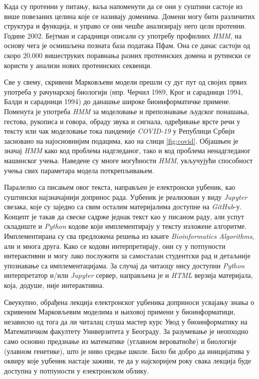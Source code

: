 \documentclass[12pt,oneside]{memoir}
\begin{document}
\begin{CJK}{UTF8}{ipxm}
Када су протеини у питању, ваља напоменути да се они у суштини састоје из више повезаних целина које се називају доменима. Домени могу бити различитих структура и функција, и управо се они чешће анализирају него цели протеини. Године 2002. Бејтман и сарадници описали су употребу профилних \textit{HMM}, на основу чега је осмишљена позната база података Пфам\cite{bateman2002}. Она се данас састоји од скоро 20.000 вишеструких поравнања разних протеинских домена и рутински се користи у анализи нових протеинских секвенци\cite{pfam}.

Све у свему, скривени Марковљеви модели прешли су дуг пут од својих првих употреба у рачунарској биологији (нпр. Черчил 1989\cite{churchill1989}, Крог и сарадници 1994\cite{krogh1994}, Балди и сарадници 1994\cite{baldi1994}) до данашње широке биоинформатичке примене. Поменута је употреба \textit{HMM} за моделовање и препознавање људског понашања, гестова, рукописа и говора, обраду звука и сигнала, одређивање врсте речи у тексту или чак моделовање тока пандемије \textit{COVID-19} у Републици Србији засновано на најосновнијим подацима, као на слици \ref{fig:covid}. Објашњен је значај \textit{HMM} како код проблема надгледаног, тако и код проблема ненадгледаног машинског учења. Наведене су многе могућности \textit{HMM}, укључујући способност учења свих параметара модела поткрепљивањем.

Паралелно са писањем овог текста, направљен је електронски уџбеник, као суштински најзначајнији допринос рада. Уџбеник је реализован у виду \textit{Jupyter} свезака, које су заједно са свим осталим материјалима доступне на \textit{GitHub}-у\cite{vasovich2021}. Концепт је такав да свеске садрже једнак текст као у писаном раду, али успут складиште и \textit{Python} кодове који имплементирају у тексту изложене алгоритме. Имплементирана су сва предложена решења из књиге \textit{Bioinformatics Algorithms}, али и многа друга. Како се кодови интерпретирају, они су у потпуности интерактивни и могу лако послужити за самосталан студентски рад и детаљније упознавање са имплементацијама. За случај да читаоцу нису доступни \textit{Python} интерпретатор и/или \textit{Jupyter} сервер, направљена је и \textit{HTML} верзија материјала, која, додуше, није интерактивна.

Свеукупно, обрађена лекција електронског уџбеника доприноси усвајању знања о скривеним Марковљевим моделима и њиховој примени у биоинформатици, независно од тога да ли читалац слуша мастер курс Увод у биоинформатику на Математичком факултету Универзитета у Београду. За разумевање је неопходно само основно предзнање из математике (углавном вероватноће) и биологије (улавном генетике), што је ниво средње школе. Било би добро да иницијатива у оквиру које уџбеник настаје заживи, те да у најскоријем року свака лекција буде доступна у потпуности у електронском облику.

\literatura

\end{CJK}
\end{document}
